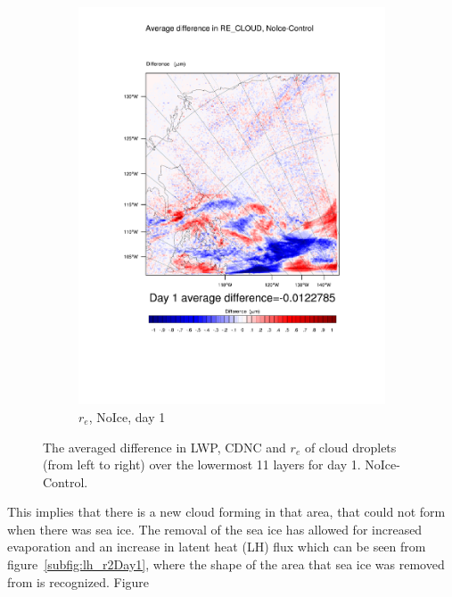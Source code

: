 \begin{figure}[h]
\begin{subfigure}{0.30\textwidth}
		\includegraphics[width=\textwidth]{results/noice/diff_NoIce_RE_CLOUD_Day1.pdf}
		\caption{$r_e$, NoIce, day 1}
		\label{subfig:recloud_r2Day1}
	\end{subfigure}
\caption{The averaged difference in LWP, CDNC and $r_e$ of cloud droplets (from left to right) over the lowermost 11 layers for day 1. NoIce-Control.}
\label{fig:lwpcdncre_r2Day1}
\end{figure}

This implies that there is a new cloud forming in that area, that could not form when there was sea ice. The removal of the sea ice has allowed for increased evaporation and an increase in latent heat (LH) flux which can be seen from figure~\ref{subfig:lh_r2Day1}, where the shape of the area that sea ice was removed from is recognized. Figure


